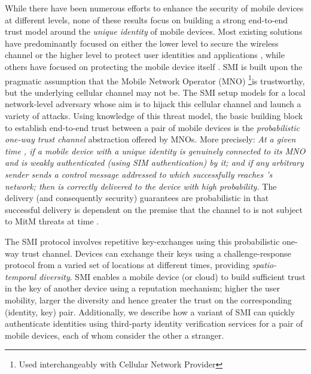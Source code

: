 \documentclass[letterpaper,twocolumn]{sig-alternate}
\begin{document}
While there have been numerous efforts to enhance the security of mobile devices at different levels, none of these results focus on building a strong end-to-end trust model around the {\em unique identity} of mobile devices. Most existing solutions have predominantly focused on either the lower level to secure the wireless channel \cite{securepairing, bambos2000channel} or the higher level to protect user identities and applications \cite{lookout, otp, 2fauth}, while others have focused on protecting the mobile device itself \cite{cook2010method}. SMI is built upon the pragmatic assumption that the Mobile Network Operator (MNO) \footnote{Used interchangeably with Cellular Network Provider}is trustworthy, but the underlying cellular channel may not be. The SMI setup models for a local network-level adversary whose aim is to hijack this cellular channel and launch a variety of attacks. Using knowledge of this threat model, the basic building block to establish end-to-end trust between a pair of mobile devices is the {\em probabilistic one-way trust channel} abstraction offered by MNOs. More precisely: {\em At a given time , if a mobile device with a unique identity  is genuinely connected to its MNO  and is weakly authenticated (using SIM authentication) by it; and if any arbitrary sender sends a control message  addressed to  which successfully reaches 's network; then  is correctly delivered to the device  with high probability.} The delivery (and consequently security) guarantees are probabilistic in that successful delivery is dependent on the premise that the channel to  is not subject to MitM threats at time .

The SMI protocol involves repetitive key-exchanges using this probabilistic one-way trust channel. Devices can exchange their keys using a challenge-response protocol from a varied set of locations at different times, providing {\em spatio-temporal diversity}. SMI enables a mobile device (or cloud) to build sufficient trust in the key of another device using a reputation mechanism; higher the user mobility, larger the diversity and hence greater the trust on the corresponding (identity, key) pair. Additionally, we describe how a variant of SMI can quickly authenticate identities using third-party identity verification services for a pair of mobile devices, each of whom consider the other a stranger. 
\end{document}

